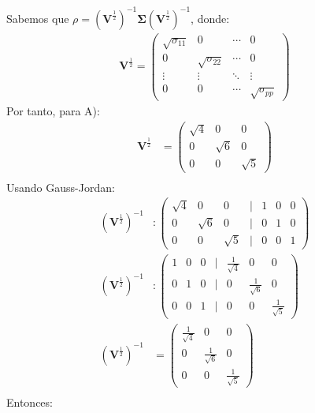 Sabemos que $\rho = (\mathbf{V}^{\frac{1}{2}})^{-1} \mathbf{\Sigma} (\mathbf{V}^{\frac{1}{2}})^{-1}$, donde:
\begin{align*}
\mathbf{V}^{\frac{1}{2}}=
\begin{pmatrix}
\sqrt{\sigma_{11}} & 0 & \cdots & 0 \\
0 & \sqrt{\sigma_{22}} & \cdots & 0 \\
\vdots & \vdots & \ddots & \vdots \\
0 & 0 & \cdots & \sqrt{\sigma_{pp}}
\end{pmatrix}
\end{align*}
Por tanto, para A):
\begin{align*}\mathbf{V}^{\frac{1}{2}} &=
\begin{pmatrix}
\sqrt{4} & 0 & 0 \\
0 & \sqrt{6} & 0 \\
0 & 0 & \sqrt{5}
\end{pmatrix}\\
\end{align*}
Usando Gauss-Jordan:
\begin{align*}
(\mathbf{V}^{\frac{1}{2}})^{-1} &:
\begin{pmatrix}
\sqrt{4} & 0 & 0 & \vert &1 & 0 & 0 \\
0 & \sqrt{6} & 0 & \vert &0 & 1 & 0 \\
0 & 0 & \sqrt{5} & \vert & 0 & 0 & 1 
\end{pmatrix}\\
(\mathbf{V}^{\frac{1}{2}})^{-1} &:
\begin{pmatrix}
1 & 0 & 0 & \vert &\frac{1}{\sqrt{4}} & 0 & 0 \\
0 & 1 & 0 & \vert &0 &\frac{1}{\sqrt{6}} & 0 \\
0 & 0 & 1 & \vert & 0 & 0 & \frac{1}{\sqrt{5}}
\end{pmatrix}\\
(\mathbf{V}^{\frac{1}{2}})^{-1} &= 
\begin{pmatrix}
\frac{1}{\sqrt{4}} & 0 & 0 \\
0 &\frac{1}{\sqrt{6}} & 0 \\
 0 & 0 & \frac{1}{\sqrt{5}}
\end{pmatrix}\\
\end{align*}
Entonces:
